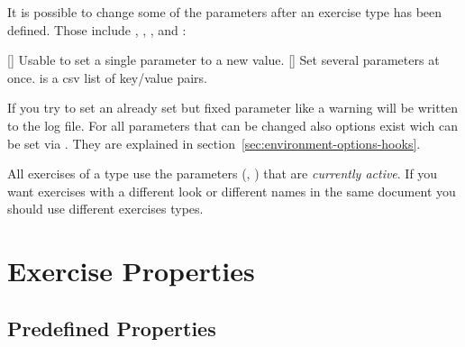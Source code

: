 \documentclass{xsim-manual}
\begin{document}
It is possible to change some of the parameters after an exercise type has
been defined.  Those include ,
, , and
:
\begin{commands}
  []
    Usable to set a single parameter to a new value.
  []
    Set several parameters at once.  is a csv list of
    key/value pairs.
\end{commands}
If you try to set an already set but fixed parameter like
 a warning will be written to the log file.  For all
parameters that can be changed also options exist wich can be set via
.  They are explained in
section~\vref{sec:environment-options-hooks}.

\begin{bewareofthedog}
  All exercises of a type use the parameters
  (\eg, ) that are \emph{currently active}.  If
  you want exercises with a different look or different names in the same
  document you should use different exercises types.
\end{bewareofthedog}

\section{Exercise Properties}\label{sec:exercise-properties}

\subsection{Predefined Properties}
\end{document}
